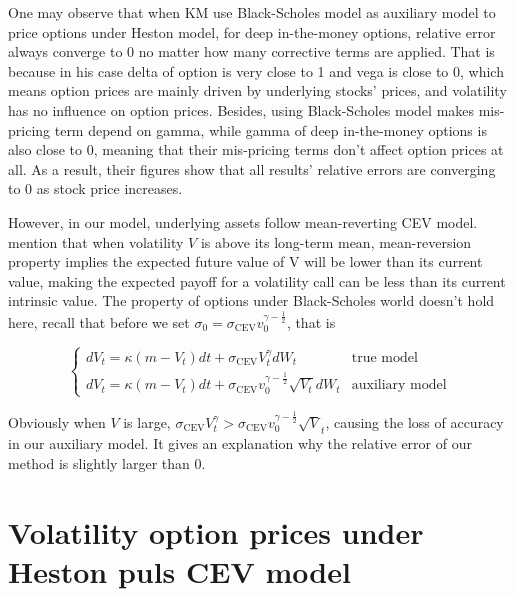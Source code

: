 One may observe that when KM use Black-Scholes model as auxiliary model to price options under Heston model, for deep in-the-money options, relative error always converge to 0 no matter how many corrective terms are applied. That is because in his case delta of option is very close to 1 and vega is close to 0, which means option prices are mainly driven by underlying stocks' prices, and volatility has no influence on option prices. Besides, using Black-Scholes model makes mis-pricing term depend on gamma, while gamma of deep in-the-money options is also close to 0, meaning that their mis-pricing terms don't affect option prices at all. As a result, their figures show that all results' relative errors are converging to 0 as stock price increases.

However, in our model, underlying assets follow mean-reverting CEV model. \cite{grunbichler_valuing_1996} mention that when volatility $V$ is above its long-term mean, mean-reversion property implies the expected future value of V will be lower than its current value, making the expected payoff for a volatility call can be less than its current intrinsic value. The property of options under Black-Scholes world doesn't hold here, recall that before we set $\sigma_0 = \sigma_{\text{CEV}}v_0^{\gamma-\frac{1}{2}}$, that is 

$$
\begin{cases}
  d V_t=\kappa(m - V_t) d t+\sigma_{\text{CEV}} V^{\gamma}_t d W_t &\text{true model}\\
  d V_t=\kappa(m - V_t) d t+\sigma_{\text{CEV}}v_0^{\gamma-\frac{1}{2}} \sqrt{V_t} d W_t &\text{auxiliary model}
\end{cases}
$$

\noindent Obviously when $V$ is large, $\sigma_{\text{CEV}} V^{\gamma}_t > \sigma_{\text{CEV}}v_0^{\gamma-\frac{1}{2}} \sqrt{V}_t$, causing the loss of accuracy in our auxiliary model. It gives an explanation why the relative error of our method is slightly larger than 0.

\section{Volatility option prices under Heston puls CEV model}

